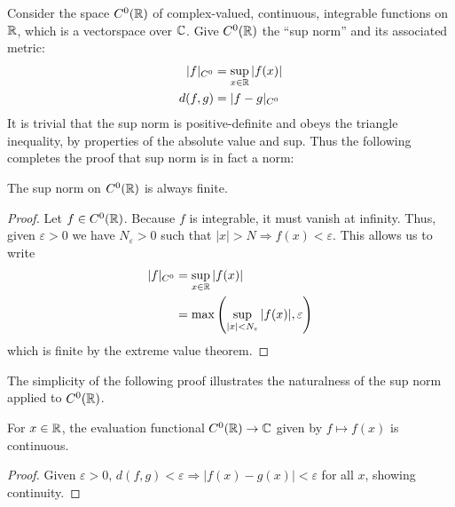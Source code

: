       Consider the space $C^0(\mathbb{R})$ of complex-valued, continuous, integrable functions on $\mathbb{R}$, which is a vectorspace over $\mathbb{C}$.
      Give $C^0(\mathbb{R})$ the ``sup norm'' and its associated metric:
      \begin{align*}
        |f|_{C^0} &= \sup_{x\in\mathbb{R}}|f(x)|\\
        d(f,g) &= |f-g|_{C^0}
      \end{align*}
      It is trivial that the sup norm is positive-definite and obeys the triangle inequality, by properties of the absolute value and sup.
      Thus the following completes the proof that sup norm is in fact a norm:
      \begin{claim}
        The sup norm on $C^0(\mathbb{R})$ is always finite.
        \begin{proof}
          Let $f\in C^0(\mathbb{R})$.
          Because $f$ is integrable, it must vanish at infinity.
          Thus, given $\varepsilon>0$ we have $N_\varepsilon>0$ such that $|x|>N\Rightarrow f(x)<\varepsilon$.
          This allows us to write
          \begin{align*}
            |f|_{C^0} &= \sup_{x\in\mathbb{R}}|f(x)|\\
            &= \max\left(\sup_{|x|<N_\varepsilon}|f(x)|,\varepsilon\right)
          \end{align*}
          which is finite by the extreme value theorem.
        \end{proof}
      \end{claim}

      The simplicity of the following proof illustrates the naturalness of the sup norm applied to $C^0(\mathbb{R})$.
      \begin{claim}
        For $x\in\mathbb{R}$, the evaluation functional $C^0(\mathbb{R})\rightarrow\mathbb{C}$ given by $f\mapsto f(x)$ is continuous.
        \begin{proof}
          Given $\varepsilon > 0$, $d(f,g)<\varepsilon \Rightarrow |f(x)-g(x)|<\varepsilon$ for all $x$, showing continuity.
        \end{proof}
      \end{claim}

